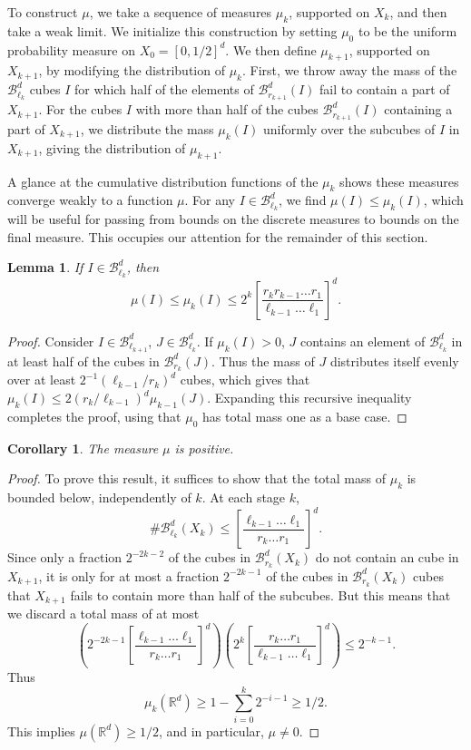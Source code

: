 \documentclass[usenames,dvipsnames,letterpaper, reqno,11pt]{article}
\theoremstyle{plain}
\newtheorem{lemma}{Lemma}
\newtheorem{corollary}{Corollary}
\theoremstyle{plain}
\newcommand{\RR}{\mathbb{R}}
\begin{document}
To construct $\mu$, we take a sequence of measures $\mu_k$, supported on $X_k$, and then take a weak limit. We initialize this construction by setting $\mu_0$ to be the uniform probability measure on $X_0 = [0,1/2]^d$. We then define $\mu_{k+1}$, supported on $X_{k+1}$, by modifying the distribution of $\mu_k$. First, we throw away the mass of the $\mathcal{B}^d_{\ell_k}$ cubes $I$ for which half of the elements of $\mathcal{B}^d_{r_{k+1}}(I)$ fail to contain a part of $X_{k+1}$. For the cubes $I$ with more than half of the cubes $\mathcal{B}^d_{r_{k+1}}(I)$ containing a part of $X_{k+1}$, we distribute the mass $\mu_k(I)$ uniformly over the subcubes of $I$ in $X_{k+1}$, giving the distribution of $\mu_{k+1}$.

A glance at the cumulative distribution functions of the $\mu_k$ shows these measures converge weakly to a function $\mu$. For any $I \in \mathcal{B}^d_{\ell_k}$, we find $\mu(I) \leq \mu_k(I)$, which will be useful for passing from bounds on the discrete measures to bounds on the final measure. This occupies our attention for the remainder of this section.

\begin{lemma}
	If $I \in \mathcal{B}^d_{\ell_k}$, then
	\[ \mu(I) \leq \mu_k(I) \leq 2^k \left[ \frac{r_k r_{k-1} \dots r_1}{\ell_{k-1} \dots \ell_1} \right]^d. \]
\end{lemma}
\begin{proof}
	Consider $I \in \mathcal{B}^d_{\ell_{k+1}}$, $J \in \mathcal{B}^d_{\ell_k}$. If $\mu_k(I) > 0$, $J$ contains an element of $\mathcal{B}^d_{\ell_k}$ in at least half of the cubes in $\mathcal{B}^d_{r_k}(J)$. Thus the mass of $J$ distributes itself evenly over at least $2^{-1} (\ell_{k-1}/r_k)^d$ cubes, which gives that $\mu_k(I) \leq 2(r_k/\ell_{k-1})^d \mu_{k-1}(J)$. Expanding this recursive inequality completes the proof, using that $\mu_0$ has total mass one as a base case.
\end{proof}

\begin{corollary}
	The measure $\mu$ is positive.
\end{corollary}
\begin{proof}
	To prove this result, it suffices to show that the total mass of $\mu_k$ is bounded below, independently of $k$. At each stage $k$,
	\[ \# \mathcal{B}^d_{\ell_k}(X_k) \leq \left[ \frac{\ell_{k-1} \dots \ell_1}{r_k \dots r_1} \right]^d. \]
	Since only a fraction $2^{-2k-2}$ of the cubes in $\mathcal{B}^d_{r_k}(X_k)$ do not contain an cube in $X_{k+1}$, it is only for at most a fraction $2^{-2k-1}$ of the cubes in $\mathcal{B}^d_{r_k}(X_k)$ cubes that $X_{k+1}$ fails to contain more than half of the subcubes. But this means that we discard a total mass of at most
	\[ \left( 2^{-2k - 1} \left[ \frac{\ell_{k-1} \dots \ell_1}{r_k \dots r_1} \right]^d \right) \left( 2^{k} \left[ \frac{r_k \dots r_1}{\ell_{k-1} \dots \ell_1} \right]^d \right) \leq 2^{-k-1}. \]
	Thus
	\[ \mu_k(\RR^d) \geq 1 - \sum_{i = 0}^k 2^{-i-1} \geq 1/2. \]
	This implies $\mu(\RR^d) \geq 1/2$, and in particular, $\mu \neq 0$.
\end{proof}
\end{document}
